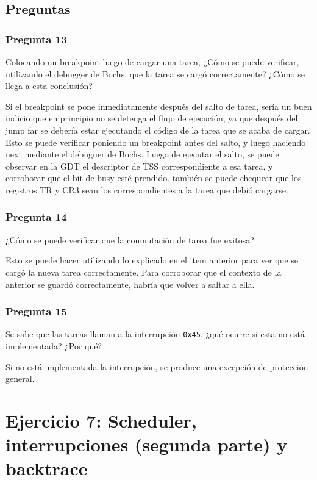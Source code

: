 \documentclass[10pt, a4paper]{article}
\begin{document}
\subsection{Preguntas}
\subsubsection*{Pregunta 13}
 \begin{framed}
Colocando un breakpoint luego de cargar una tarea, ¿Cómo se puede verificar, utilizando el debugger de Bochs, que la tarea se cargó correctamente?
¿Cómo se llega a esta conclusión?
\end{framed}
Si el breakpoint se pone inmediatamente después del salto de tarea, sería un buen indicio que en principio no se detenga el flujo de ejecución, ya que
después del jump far se debería estar ejecutando el código de la tarea que se acaba de cargar. Esto se puede verificar poniendo un breakpoint antes del salto, y luego 
haciendo  next mediante el debuguer de Bochs. Luego de ejecutar el salto, se puede observar en la GDT el descriptor de TSS correspondiente a esa tarea, y corroborar
que el bit de busy esté prendido. también se puede chequear que los registros TR y CR3 sean los correspondientes a la tarea que debió cargarse.
\subsubsection*{Pregunta 14}
 \begin{framed}
¿Cómo se puede verificar que la conmutación de tarea fue exitosa?
\end{framed}
Esto se puede hacer utilizando lo explicado en el item anterior para ver que se cargó la nueva tarea correctamente. Para corroborar que el contexto de la anterior se guardó correctamente, habría que volver a saltar a ella.

\subsubsection*{Pregunta 15}
 \begin{framed}
Se sabe que las tareas llaman a la interrupción \texttt{0x45}. ¿qué ocurre si esta no está implementada? ¿Por qué?
\end{framed}
Si no está implementada la interrupción, se produce una excepción de protección general.
\section{Ejercicio 7: Scheduler, interrupciones (segunda parte) y backtrace}
\end{document}
